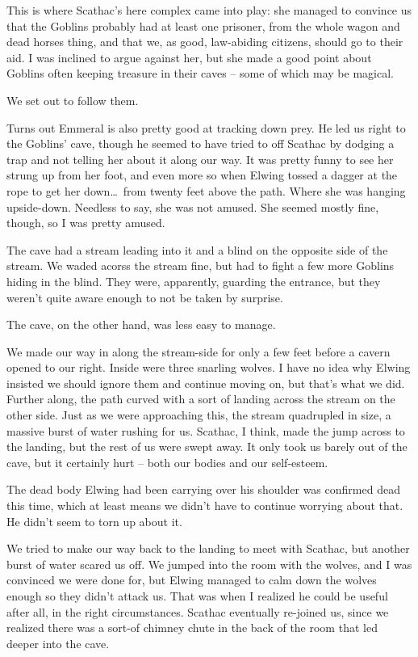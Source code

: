 This is where Scathac's here complex came into play: she managed to convince us that the Goblins probably had at least one prisoner, from the whole wagon and dead horses thing, and that we, as good, law-abiding citizens, should go to their aid. I was inclined to argue against her, but she made a good point about Goblins often keeping treasure in their caves -- some of which may be magical.

We set out to follow them.

Turns out Emmeral is also pretty good at tracking down prey. He led us right to the Goblins' cave, though he seemed to have tried to off Scathac by dodging a trap and not telling her about it along our way. It was pretty funny to see her strung up from her foot, and even more so when Elwing tossed a dagger at the rope to get her down\dots\ from twenty feet above the path. Where she was hanging upside-down. Needless to say, she was not amused. She seemed mostly fine, though, so I was pretty amused.

The cave had a stream leading into it and a blind on the opposite side of the stream. We waded acorss the stream fine, but had to fight a few more Goblins hiding in the blind. They were, apparently, guarding the entrance, but they weren't quite aware enough to not be taken by surprise.

The cave, on the other hand, was less easy to manage.

We made our way in along the stream-side for only a few feet before a cavern opened to our right. Inside were three snarling wolves. I have no idea why Elwing insisted we should ignore them and continue moving on, but that's what we did. Further along, the path curved with a sort of landing across the stream on the other side. Just as we were approaching this, the stream quadrupled in size, a massive burst of water rushing for us. Scathac, I think, made the jump across to the landing, but the rest of us were swept away. It only took us barely out of the cave, but it certainly hurt -- both our bodies and our self-esteem.

The dead body Elwing had been carrying over his shoulder was confirmed dead this time, which at least means we didn't have to continue worrying about that. He didn't seem to torn up about it.

We tried to make our way back to the landing to meet with Scathac, but another burst of water scared us off. We jumped into the room with the wolves, and I was convinced we were done for, but Elwing managed to calm down the wolves enough so they didn't attack us. That was when I realized he could be useful after all, in the right circumstances. Scathac eventually re-joined us, since we realized there was a sort-of chimney chute in the back of the room that led deeper into the cave.

